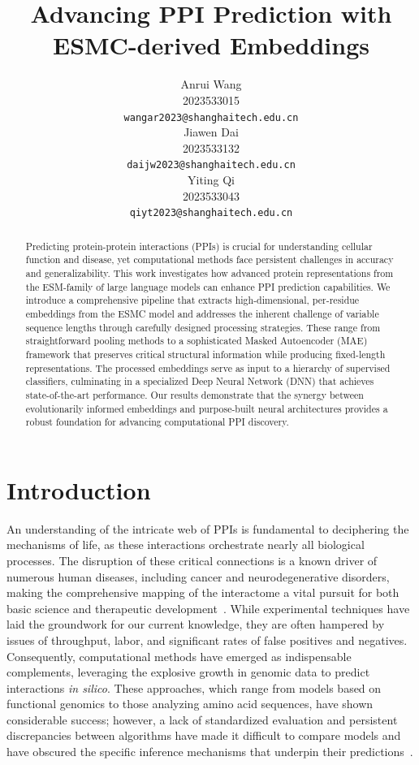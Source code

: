 \documentclass{article}
\title{Advancing PPI Prediction with ESMC-derived Embeddings}
\author{
	Anrui Wang \\
	2023533015 \\
	\texttt{wangar2023@shanghaitech.edu.cn}\\
	\And
	Jiawen Dai \\
	2023533132 \\
	\texttt{daijw2023@shanghaitech.edu.cn}\\
	 \AND
	 Yiting Qi \\
	 2023533043 \\
	 \texttt{qiyt2023@shanghaitech.edu.cn}\\
}
\begin{document}
	
	
	\maketitle
	
	
	\begin{abstract}
		Predicting protein-protein interactions (PPIs) is crucial for understanding cellular function and disease, yet computational methods face persistent challenges in accuracy and generalizability. This work investigates how advanced protein representations from the ESM-family of large language models can enhance PPI prediction capabilities. We introduce a comprehensive pipeline that extracts high-dimensional, per-residue embeddings from the ESMC model and addresses the inherent challenge of variable sequence lengths through carefully designed processing strategies. These range from straightforward pooling methods to a sophisticated Masked Autoencoder (MAE) framework that preserves critical structural information while producing fixed-length representations. The processed embeddings serve as input to a hierarchy of supervised classifiers, culminating in a specialized Deep Neural Network (DNN) that achieves state-of-the-art performance. Our results demonstrate that the synergy between evolutionarily informed embeddings and purpose-built neural architectures provides a robust foundation for advancing computational PPI discovery.
	\end{abstract}
	
	
	\section{Introduction}

	An understanding of the intricate web of PPIs is fundamental to deciphering the mechanisms of life, as these interactions orchestrate nearly all biological processes. The disruption of these critical connections is a known driver of numerous human diseases, including cancer and neurodegenerative disorders, making the comprehensive mapping of the interactome a vital pursuit for both basic science and therapeutic development~\citep{recent_advances_ppi_2023}. While experimental techniques have laid the groundwork for our current knowledge, they are often hampered by issues of throughput, labor, and significant rates of false positives and negatives. Consequently, computational methods have emerged as indispensable complements, leveraging the explosive growth in genomic data to predict interactions \emph{in silico}. These approaches, which range from models based on functional genomics to those analyzing amino acid sequences, have shown considerable success; however, a lack of standardized evaluation and persistent discrepancies between algorithms have made it difficult to compare models and have obscured the specific inference mechanisms that underpin their predictions~\citep{pitfalls_ml_ppi_2023}.
\end{document}
